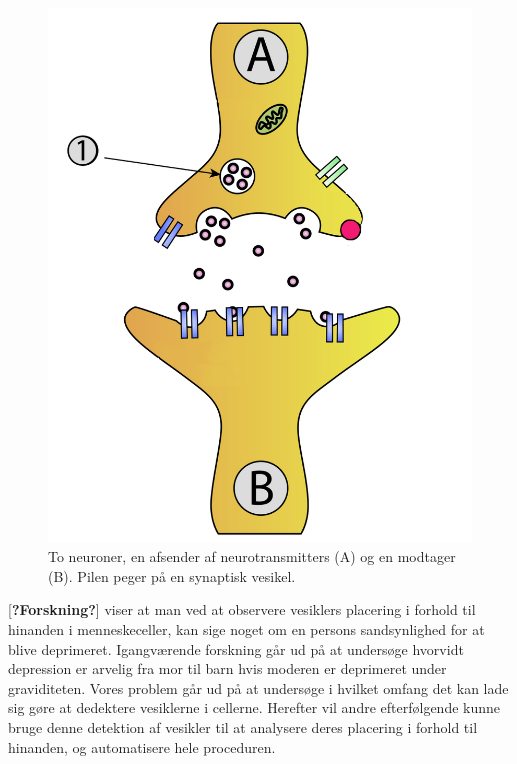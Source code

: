 \begin{figure}[H]
	\centering
	\includegraphics[scale=0.2]{files/intro/img/synTransmitter.png}
	\caption{To neuroner, en afsender af neurotransmitters (A) og en modtager (B). Pilen peger på en synaptisk vesikel.\label{fig:intro_syntrans}}
\end{figure} 

[\textbf{?Forskning?}] viser at man ved at observere vesiklers placering i forhold til hinanden i menneskeceller, kan sige noget om en persons sandsynlighed for at blive deprimeret.
Igangværende forskning går ud på at undersøge hvorvidt depression er arvelig fra mor til barn hvis moderen er deprimeret under graviditeten.
Vores problem går ud på at undersøge i hvilket omfang det kan lade sig gøre at dedektere vesiklerne i cellerne.
Herefter vil andre efterfølgende kunne bruge denne detektion af vesikler til at analysere deres placering i forhold til hinanden, og automatisere hele proceduren.

